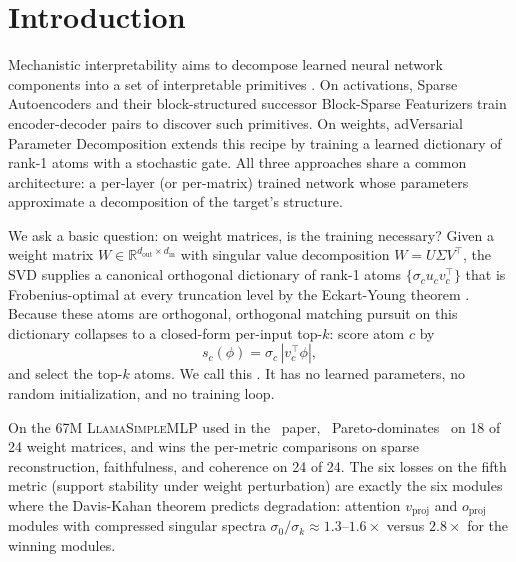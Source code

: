 \section{Introduction}

Mechanistic interpretability aims to decompose learned neural network components into a set of interpretable primitives \citep{elhage2021mathematical, bricken2023towards}. On activations, Sparse Autoencoders \citep{cunningham2023sparse} and their block-structured successor Block-Sparse Featurizers \citep{goodfire2026bsf} train encoder-decoder pairs to discover such primitives. On weights, adVersarial Parameter Decomposition \citep{bushnaq2026vpd} extends this recipe by training a learned dictionary of rank-1 atoms with a stochastic gate. All three approaches share a common architecture: a per-layer (or per-matrix) trained network whose parameters approximate a decomposition of the target's structure.

We ask a basic question: on weight matrices, is the training necessary? Given a weight matrix $W \in \mathbb{R}^{d_\text{out} \times d_\text{in}}$ with singular value decomposition $W = U \Sigma V^\top$, the SVD supplies a canonical orthogonal dictionary of rank-1 atoms $\{\sigma_c u_c v_c^\top\}$ that is Frobenius-optimal at every truncation level by the Eckart-Young theorem \citep{eckart1936approximation}. Because these atoms are orthogonal, orthogonal matching pursuit \citep{pati1993omp} on this dictionary collapses to a closed-form per-input top-$k$: score atom $c$ by
\begin{equation}
s_c(\phi) = \sigma_c \, |v_c^\top \phi|,
\label{eq:score}
\end{equation}
and select the top-$k$ atoms. We call this \svdomp. It has no learned parameters, no random initialization, and no training loop.

On the 67M \textsc{LlamaSimpleMLP} used in the \vpd\ paper, \svdomp\ Pareto-dominates \vpd\ on 18 of 24 weight matrices, and wins the per-metric comparisons on sparse reconstruction, faithfulness, and coherence on 24 of 24. The six losses on the fifth metric (support stability under weight perturbation) are exactly the six modules where the Davis-Kahan theorem \citep{davis1970rotation} predicts degradation: attention $v_\text{proj}$ and $o_\text{proj}$ modules with compressed singular spectra $\sigma_0 / \sigma_k \approx 1.3\text{--}1.6\times$ versus $2.8\times$ for the winning modules.

